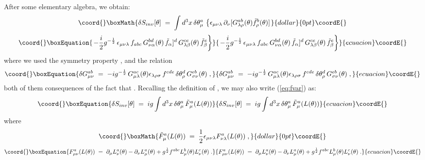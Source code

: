 \documentclass[a4paper,12pt]{article}
\begin{document}
After some elementary algebra, we obtain:
$$\coord{}\boxMath{
\delta S_{inv}[\theta] \;=\; \int d^3x \,\delta\theta_\mu^a \,
\left\{ \epsilon_{\mu\nu\lambda}\,\partial_\nu
[  G_{\lambda\rho}^{ab}(\theta) {\tilde f}_\rho^b(\theta) ] \right.
}{dollar}{0pt}\coordE{}$$
\begin{equation}\coord{}\boxEquation{\label{eq:fvar}
\left. -\frac{i}{2} g^{-\frac{1}{2}} \,  \epsilon_{\mu\nu\lambda}
\, f_{abc}\, G_{\nu\alpha}^{bd}(\theta)\,{\tilde f}_\alpha]^d
\, G_{\lambda\beta}^{ce}(\theta) \, {\tilde f}_\beta^e \right\}
}{\left. -\frac{i}{2} g^{-\frac{1}{2}} \,  \epsilon_{\mu\nu\lambda}
\, f_{abc}\, G_{\nu\alpha}^{bd}(\theta)\,{\tilde f}_\alpha]^d
\, G_{\lambda\beta}^{ce}(\theta) \, {\tilde f}_\beta^e \right\}
}{ecuacion}\coordE{}\end{equation}
where we used the symmetry property \coordHE{}, and
the relation
\begin{equation}\coord{}\boxEquation{
\delta G_{\mu\nu}^{ab} \;=\; - i g^{-\frac{1}{2}}\,
G_{\mu\lambda}^{ac}(\theta)\epsilon_{\lambda\rho\sigma} \, f^{cde} \,
\delta\theta_{\rho}^d \,  G_{\sigma\nu}^{eb} (\theta)\;,
}{
\delta G_{\mu\nu}^{ab} \;=\; - i g^{-\frac{1}{2}}\,
G_{\mu\lambda}^{ac}(\theta)\epsilon_{\lambda\rho\sigma} \, f^{cde} \,
\delta\theta_{\rho}^d \,  G_{\sigma\nu}^{eb} (\theta)\;,
}{ecuacion}\coordE{}\end{equation}
both of them consequences of the fact that \coordHE{}.
Recalling the definition of \coordHE{}, we may also write
(\ref{eq:fvar}) as:
\begin{equation}\coord{}\boxEquation{\label{eq:fvar1}
\delta S_{inv}[\theta] \;=\; i g \int d^3x \, \delta\theta_\mu^a \,
{\tilde F}_\mu^a (L(\theta))
}{\delta S_{inv}[\theta] \;=\; i g \int d^3x \, \delta\theta_\mu^a \,
{\tilde F}_\mu^a (L(\theta))
}{ecuacion}\coordE{}\end{equation}
where
$$\coord{}\boxMath{
{\tilde F}_\mu^a (L(\theta)) \;=\; \frac{1}{2}
\epsilon_{\mu\nu\lambda} F^a_{\nu\lambda}(L(\theta)) \;,
}{dollar}{0pt}\coordE{}$$
\begin{equation}\coord{}\boxEquation{\label{eq:defF}
F_{\mu\nu}^a (L(\theta)) \;=\; \partial_\mu L_\nu^a (\theta) - \partial_\nu
L_\mu^a(\theta) + g^{\frac{1}{2}} f^{abc}L_\mu^b(\theta) L_\nu^c
(\theta)\;.
}{F_{\mu\nu}^a (L(\theta)) \;=\; \partial_\mu L_\nu^a (\theta) - \partial_\nu
L_\mu^a(\theta) + g^{\frac{1}{2}} f^{abc}L_\mu^b(\theta) L_\nu^c
(\theta)\;.
}{ecuacion}\coordE{}\end{equation}
\end{document}
